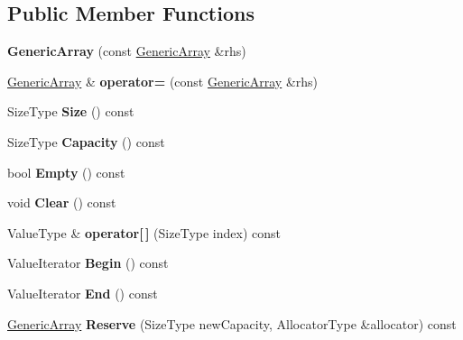 \subsection*{Public Member Functions}
\begin{DoxyCompactItemize}
\item 
\mbox{\label{classGenericArray_aa589d897a194b349d5053391a6f1491d}} 
{\bfseries Generic\+Array} (const \hyperlink{classGenericArray}{Generic\+Array} \&rhs)
\item 
\mbox{\label{classGenericArray_addbff152092d0998b2c550bd575f4b83}} 
\hyperlink{classGenericArray}{Generic\+Array} \& {\bfseries operator=} (const \hyperlink{classGenericArray}{Generic\+Array} \&rhs)
\item 
\mbox{\label{classGenericArray_a62d5b7f423edc2141cd4524c7dfd138b}} 
Size\+Type {\bfseries Size} () const
\item 
\mbox{\label{classGenericArray_ab385434ab7a99de7a0a17e5ee7e09d7f}} 
Size\+Type {\bfseries Capacity} () const
\item 
\mbox{\label{classGenericArray_af09e3aaeaeeb5fd825d79cc6663dfcf5}} 
bool {\bfseries Empty} () const
\item 
\mbox{\label{classGenericArray_a5e6c158ff76ab8a8ed568fa486e63c80}} 
void {\bfseries Clear} () const
\item 
\mbox{\label{classGenericArray_aa185d997e7787e9b4f624d5de592b886}} 
Value\+Type \& {\bfseries operator\mbox{[}$\,$\mbox{]}} (Size\+Type index) const
\item 
\mbox{\label{classGenericArray_a3efaa020b29ceed9c1a03465676a32a7}} 
Value\+Iterator {\bfseries Begin} () const
\item 
\mbox{\label{classGenericArray_a396f83d328f4879225106ea14b1dca84}} 
Value\+Iterator {\bfseries End} () const
\item 
\mbox{\label{classGenericArray_a7c74901e8e2174fe4661f4848995f355}} 
\hyperlink{classGenericArray}{Generic\+Array} {\bfseries Reserve} (Size\+Type new\+Capacity, Allocator\+Type \&allocator) const

\end{DoxyCompactItemize}
